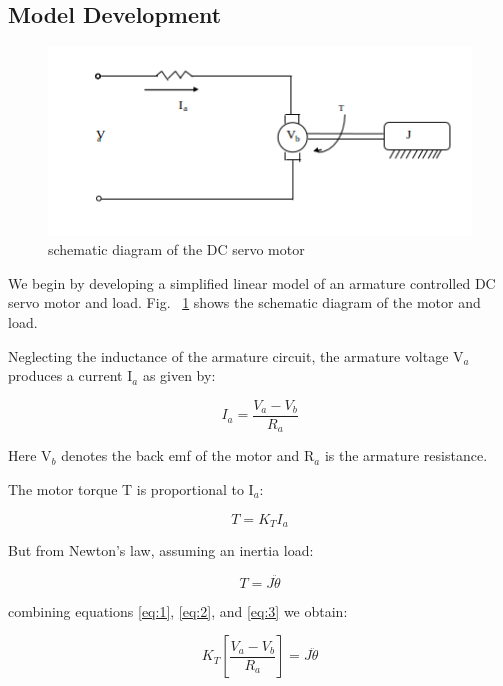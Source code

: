 \documentclass[11pt,a4paper]{article}
\begin{document}
\subsection{Model Development}
\begin{figure}[here]
\includegraphics[width=\textwidth]{imglab/servoschemdiagram.png}
\caption{schematic diagram of the DC servo motor}
\label{fig:servoschem}
\end{figure}

We begin by developing a simplified linear model of an armature controlled DC servo motor and load. Fig. ~\ref{fig:servoschem} shows the schematic diagram of the motor and load.

Neglecting the inductance of the armature circuit, the armature voltage V$_{a}$ produces a current I$_{a}$ as given by:

\begin{equation} \label{eq:1}
I_{a} = \frac{V_{a}-V_{b}}{R_{a}}
\end{equation}

Here V$_{b}$ denotes the back emf of the motor and R$_{a}$ is the armature resistance.

The motor torque T is proportional to I$_{a}$:

\begin{equation} \label{eq:2}
T = K_{T}I_{a}
\end{equation}

But from Newton's law, assuming an inertia load:

\begin{equation} \label{eq:3}
T = J\ddot{\theta}
\end{equation}

combining equations \ref{eq:1}, \ref{eq:2}, and \ref{eq:3} we obtain:

\begin{equation} \label{eq:4}
K_{T}\left[\frac{V_{a}-V_{b}}{R_{a}}\right] = J\ddot{\theta}
\end{equation} 
\end{document}

